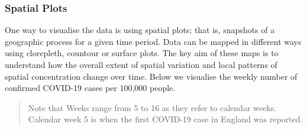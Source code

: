 \documentclass[
  letterpaper,
  DIV=11,
  numbers=noendperiod,
  oneside]{scrreprt}
\newenvironment{Shaded}{\begin{snugshade}}{\end{snugshade}}
\newcommand{\CommentTok}[1]{\textcolor[rgb]{0.37,0.37,0.37}{#1}}
\newcommand{\DecValTok}[1]{\textcolor[rgb]{0.68,0.00,0.00}{#1}}
\newcommand{\FunctionTok}[1]{\textcolor[rgb]{0.28,0.35,0.67}{#1}}
\newcommand{\NormalTok}[1]{\textcolor[rgb]{0.00,0.23,0.31}{#1}}
\newcommand{\OtherTok}[1]{\textcolor[rgb]{0.00,0.23,0.31}{#1}}
\newcommand{\SpecialCharTok}[1]{\textcolor[rgb]{0.37,0.37,0.37}{#1}}
\begin{document}
\begin{Shaded}
\end{Shaded}

\subsubsection{Spatial Plots}\label{spatial-plots}

One way to visualise the data is using spatial plots; that is, snapshots
of a geographic process for a given time period. Data can be mapped in
different ways using clorepleth, countour or surface plots. The key aim
of these maps is to understand how the overall extent of spatial
variation and local patterns of spatial concentration change over time.
Below we visualise the weekly number of confirmed COVID-19 cases per
100,000 people.

\begin{quote}
Note that Weeks range from 5 to 16 as they refer to calendar weeks.
Calendar week 5 is when the first COVID-19 case in England was reported.
\end{quote}
\end{document}
